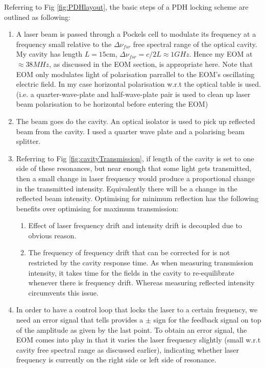 \documentclass[12pt]{report}
\begin{document}
Referring to Fig \ref{fig:PDHlayout}, the basic steps of a PDH locking scheme are outlined as following: 
\begin{enumerate}
    \item A laser beam is passed through a Pockels cell to modulate its frequency at a frequency small relative to the $\Delta \nu_{fsr}$ free spectral range of the optical cavity. My cavity has length $L=15$cm, $\Delta \nu_{fsr} = c/2L \approx 1GHz$. Hence my EOM at $\approx 38 MHz$, as discussed in the EOM section, is appropriate here. Note that EOM only modulates light of polarisation parrallel to the EOM's oscillating electric field. In my case horizontal polarisation w.r.t the optical table is used. (i.e. a quarter-wave-plate and half-wave-plate pair is used to clean up laser beam polarisation to be horizontal before entering the EOM) 

    \item The beam goes do the cavity. An optical isolator is used to pick up reflected beam from the cavity. I used a quarter wave plate and a polarising beam splitter. 

    \item Referring to Fig \ref{fig:cavityTransmission}, if length of the cavity is set to one side of these resonances, but near enough that some light gets transmitted, then a small change in laser frequency would produce a proportional change in the transmitted intensity. Equivalently there will be a change in the reflected beam intensity. Optimising for minimum reflection has the following benefits over optimising for maximum transmission: 
    \begin{enumerate}
        \item Effect of laser frequency drift and intensity drift is decoupled due to obvious reason.
        \item The frequency of frequency drift that can be corrected for is not restricted by the cavity response time. As when measuring transmission intensity, it takes time for the fields in the cavity to re-equilibrate whenever there is frequency drift. Whereas measuring reflected intensity circumvents this issue. 
    \end{enumerate}

    \item In order to have a control loop that locks the laser to a certain frequency, we need an error signal that tells provides a $\pm$ sign for the feedback signal on top of the amplitude as given by the last point. To obtain an error signal, the EOM comes into play in that it varies the laser frequency slightly (small w.r.t cavity free spectral range as discussed earlier), indicating whether laser frequency is currently on the right side or left side of resonance. 


\end{enumerate}
\end{document}
